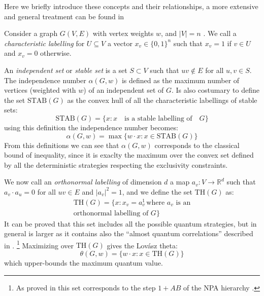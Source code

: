 \documentclass[
    nofootinbin,
    floatfix,
    amsfonts,
    twocolumn, 
    aps, 
    prl]{revtex4-1}
\newcommand{\Real}{\mathbb{R}}
\newcommand{\STAB}{\mathrm{STAB}}
\renewcommand{\TH}{\mathrm{TH}}
\begin{document}
Here we briefly introduce these concepts and their relationships, a more
extensive and general treatment can be found in \cite{cabello2014, rabelo2014} %

Consider a graph $G(V,E)$ with vertex weights $w$, and $|V| = n$ .
We call a \emph{characteristic labelling} for $U \subseteq V$ a vector $x_v \in
\{0,1\}^n$ such that $x_v = 1$ if $v \in U$ and $x_v = 0$ otherwise.

An \emph{independent set} or \emph{stable set} is a set
$S \subset V$ such that $uv \notin E$ for all $u,v \in S$.
The independence number $\alpha(G, w)$ is defined as the maximum number of
vertices (weighted with $w$) of an independent set of $G$.
Is also costumary to define the set $\STAB(G)$ as the convex hull of all the
characteristic labellings of stable sets:
\begin{equation}
    \STAB(G) = \{x : x \quad \text{is a stable labelling of}\quad G \}
    \label{eq:stab}
\end{equation}
using this definition the independence number becomes:
\begin{equation}
    \alpha(G,w) = \max\{w\cdot x: x \in \STAB(G)\}
    \label{eq:alphastab}
\end{equation}
From this definitions we can see that $\alpha(G,w)$ corresponds to the classical
bound of inequality, since it is exaclty the maximum over the convex set defined
by all the deterministic strategies respecting the exclusivity constraints.

We now call an \emph{orthonormal labelling} of dimension $d$ a map
$a_v:V\rightarrow\Real^d$ such that $a_v \cdot a_u = 0$ for all $uv \in E$ and
$|a_v|^2 = 1$, and we define the set $\TH(G)$ as:
\begin{multline}
    \TH(G) = \{x: x_v = a_v^1 \, \text{where $a_v$ is an} \\ \text{orthonormal labelling of $G$}\}
    \label{eq:thbody}
\end{multline}
It can be proved that this set includes all the possible quantum strategies, but
in general is larger as it contains also the ``almost quantum correlations''
described in .%
\footnote{As proved in \cite{} this set corresponds to the step $1+AB$ of the
NPA hierarchy \cite{}.} %
Maximizing over $\TH(G)$ gives the Lovász theta:
\begin{equation}
    \theta(G,w) = \{w\cdot x : x \in \TH(G)\}
    \label{eq:lovasztheta}
\end{equation}
which upper-bounds the maximum quantum value.
\end{document}
